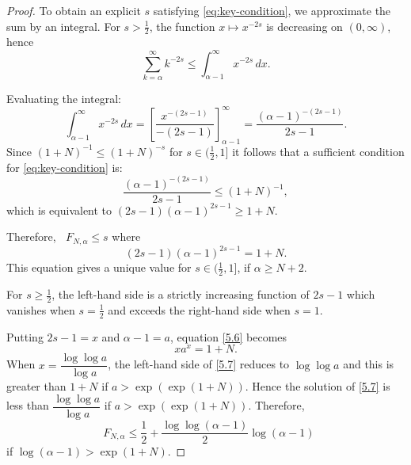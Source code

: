 \documentclass[10pt,a4paper]{amsart}
\DeclareMathOperator{\dimH}{dim_H}
\begin{document}
\begin{proof}
To obtain an explicit $s$ satisfying \eqref{eq:key-condition}, we approximate the sum by an integral.
For $s > \tfrac12$, the function $x \mapsto x^{-2s}$ is decreasing on $(0,\infty)$, hence
\[
\sum_{k=\alpha}^{\infty} k^{-2s} \leq \int_{\alpha-1}^{\infty} x^{-2s} \, dx.
\]

Evaluating the integral:
\[
\int_{\alpha-1}^{\infty} x^{-2s} \, dx = \left[ \frac{x^{-(2s-1)}}{-(2s-1)} \right]_{\alpha-1}^{\infty} 
= \frac{(\alpha-1)^{-(2s-1)}}{2s-1}.
\]
Since  $(1+N)^{-1} \le (1+N)^{-s}$ for $s \in (\frac{1}{2}, 1]$ it follows that a sufficient condition for \eqref{eq:key-condition} is:
\[
\frac{(\alpha-1)^{-(2s-1)}}{2s-1} \leq (1+N)^{-1},
\]
which is equivalent to 
$(2s-1)(\alpha-1)^{2s-1} \ge 1+N$. 

Therefore, $\dimH F_{N,\alpha} \le s$ where
\begin{equation} \label{5.6}
(2s-1)(\alpha-1)^{2s-1} = 1+N.
\end{equation}
This equation gives a unique value for $s \in (\frac{1}{2}, 1]$, if $\alpha \ge N+2$. 

For $s \ge \frac{1}{2}$, the left-hand side is a strictly increasing function of $2s-1$ which vanishes when $s=\frac{1}{2}$ and exceeds the right-hand side when $s=1$.

Putting $2s-1=x$ and $\alpha -1 =a$, equation \eqref{5.6} becomes 
\begin{equation} \label{5.7}
    x a^x = 1+N.
\end{equation}
When $x = \dfrac{\log\log a}{\log a}$, the left-hand side of \eqref{5.7} reduces to $\log \log a$ and this is greater than $1+N$ if $a > \exp(\exp(1+N))$. 
Hence the solution of \eqref{5.7} is less than $\dfrac{\log\log a}{\log a}$ if $a > \exp(\exp(1+N))$. 
Therefore, 
\[
\dimH F_{N,\alpha} \le \frac{1}{2} + \dfrac{\log\log (\alpha-1)}{2}\log (\alpha-1)
\]
if $\log(\alpha-1) > \exp(1+N)$. 
\end{proof}
\end{document}
